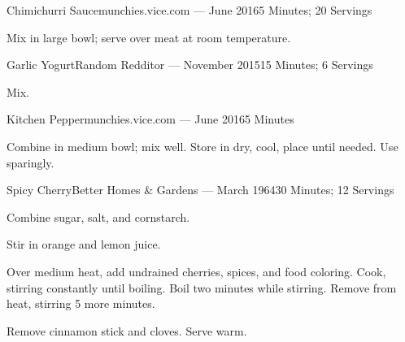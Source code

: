 \documentclass{article}
\begin{document}
\begin{recipe}{Chimichurri Sauce}{munchies.vice.com --- June 2016}{5 Minutes; 20 Servings}

   Mix in large bowl; serve over meat at room temperature.

\end{recipe}

\begin{recipe}{Garlic Yogurt}{Random Redditor --- November 2015}{15 Minutes; 6 Servings}

   Mix.

\end{recipe}

\begin{recipe}{Kitchen Pepper}{munchies.vice.com --- June 2016}{5 Minutes}

   Combine in medium bowl; mix well.  Store in dry, cool, place until needed.
   Use sparingly.

\end{recipe}

\begin{recipe}{Spicy Cherry}{Better Homes \& Gardens --- March 1964}{30 Minutes; 12 Servings}

   Combine sugar, salt, and cornstarch.

   Stir in orange and lemon juice.

   Over medium heat, add undrained cherries, spices, and food coloring.  Cook,
   stirring constantly until boiling.  Boil two minutes while stirring.  Remove
   from heat, stirring 5 more minutes.

   \freeform
   Remove cinnamon stick and cloves.  Serve warm.

\end{recipe}
\end{document}
